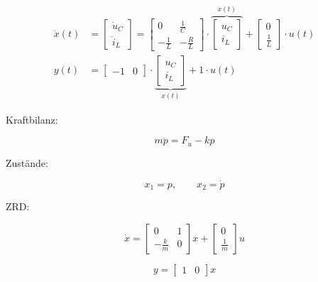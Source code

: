 \begin{align*}
    \dot{x}(t)  &= \begin{bmatrix} \dot{u}_C \\ \dot{i}_L \end{bmatrix}
                 = \begin{bmatrix} 0 & \frac{1}{C} \\ - \frac{1}{L} & - \frac{R}{L} \end{bmatrix} \cdot \overbrace{ \begin{bmatrix} u_C \\ i_L \end{bmatrix} }^{x(t)}
                 + \begin{bmatrix} 0 \\ \frac{1}{L} \end{bmatrix} \cdot u(t)\\
    y(t)        &= \begin{bmatrix} -1 & 0 \end{bmatrix} \cdot  \underbrace{ \begin{bmatrix} u_C \\ i_L \end{bmatrix} }_{x(t)} + 1 \cdot u(t)
\end{align*}

\vspace{-0.3cm}


Kraftbilanz:

\[
m\ddot p = F_u-kp
\]

Zustände:

\[
x_1=p,
\qquad
x_2=\dot p
\]

ZRD:

\[
\dot x=
\begin{bmatrix}
0 & 1\\
-\frac{k}{m} & 0
\end{bmatrix}
x+
\begin{bmatrix}
0\\
\frac{1}{m}
\end{bmatrix}
u
\]

\[
y=
\begin{bmatrix}
1 & 0
\end{bmatrix}
x
\]

